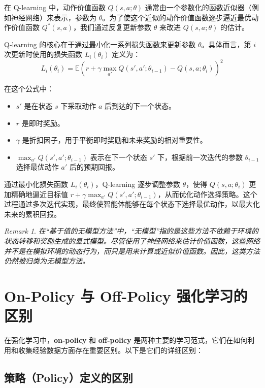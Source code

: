 \documentclass[twocolumn, 10pt]{article} %
\theoremstyle{remark}
\newtheorem{remark}{Remark}
\newenvironment{myremark}
  {\begin{remark}\itshape}
  {\end{remark}}
\begin{document}
在 Q-learning 中，动作价值函数 \( Q(s, a; \theta) \) 通常由一个参数化的函数近似器（例如神经网络）来表示，参数为 \( \theta \)。为了使这个近似的动作价值函数逐步逼近最优动作价值函数 \( Q^*(s, a) \)，我们通过反复更新参数 \( \theta \) 来改进 \( Q(s, a; \theta) \) 的估计。

Q-learning 的核心在于通过最小化一系列损失函数来更新参数 \( \theta \)。具体而言，第 \( i \) 次更新时使用的损失函数 \( L_i(\theta_i) \) 定义为：
$$
L_i(\theta_i) = \mathbb{E} \left( r + \gamma \max_{a'} Q(s', a'; \theta_{i-1}) - Q(s, a; \theta_i) \right)^2
$$

在这个公式中：
\begin{itemize}
    \item \( s' \) 是在状态 \( s \) 下采取动作 \( a \) 后到达的下一个状态。
    \item \( r \) 是即时奖励。
    \item \( \gamma \) 是折扣因子，用于平衡即时奖励和未来奖励的相对重要性。
    \item \( \max_{a'} Q(s', a'; \theta_{i-1}) \) 表示在下一个状态 \( s' \) 下，根据前一次迭代的参数 \( \theta_{i-1} \) 选择最优动作 \( a' \) 后的预期回报。
\end{itemize}

通过最小化损失函数 \( L_i(\theta_i) \)，Q-learning 逐步调整参数 \( \theta \)，使得 \( Q(s, a; \theta_i) \) 更加精确地逼近目标值 \( r + \gamma \max_{a'} Q(s', a'; \theta_{i-1}) \)，从而优化动作选择策略。这个过程通过多次迭代实现，最终使智能体能够在每个状态下选择最优动作，以最大化未来的累积回报。


\begin{myremark}
在“基于值的无模型方法”中，“无模型”指的是这些方法不依赖于环境的状态转移和奖励生成的显式模型。尽管使用了神经网络来估计价值函数，这些网络并不是在模拟环境的动态行为，而只是用来计算或近似价值函数。因此，这类方法仍然被归类为无模型方法。
\end{myremark}


\section{On-Policy 与 Off-Policy 强化学习的区别}

在强化学习中，\textbf{on-policy} 和 \textbf{off-policy} 是两种主要的学习范式，它们在如何利用和收集经验数据方面存在重要区别。以下是它们的详细区别：

\subsection{策略（Policy）定义的区别}
\end{document}
